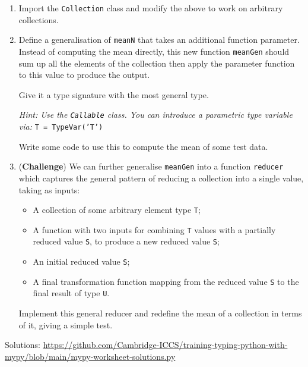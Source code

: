 \documentclass{article}
\begin{document}
\begin{enumerate}[resume]
\item Import the \texttt{Collection} class and modify the above to work on arbitrary
  collections.

\item Define a generalisation of
  \texttt{meanN} that takes an additional function parameter.
  Instead of computing the mean directly, this new function
  \texttt{meanGen} should
  sum up all the elements of the collection then apply
  the parameter function to this value to produce the output.

  Give it a type signature with
  the most general type.

  \textit{Hint: Use the \texttt{Callable} class.
    You can introduce a parametric type variable
    via: } \texttt{T = TypeVar('T')}

  Write some code to use this to compute the mean of some test data.

\item (\textbf{Challenge}) We can further generalise \texttt{meanGen} into a
  function \texttt{reducer} which captures the general pattern
  of reducing a collection into a single value, taking as inputs:
  \begin{itemize}
  \item A collection of some arbitrary element type \texttt{T};
  \item A function with two inputs for combining \texttt{T} values with
    a partially reduced value \texttt{S}, to produce a new reduced value \texttt{S};
  \item An initial reduced value \texttt{S};
  \item A final transformation function mapping from the reduced value \texttt{S} to
    the final result of type \texttt{U}.
  \end{itemize}
  Implement this general reducer and redefine the mean of a collection
  in terms of it, giving a simple test.
\end{enumerate}
%
Solutions: \url{https://github.com/Cambridge-ICCS/training-typing-python-with-mypy/blob/main/mypy-worksheet-solutions.py}
\end{document}
